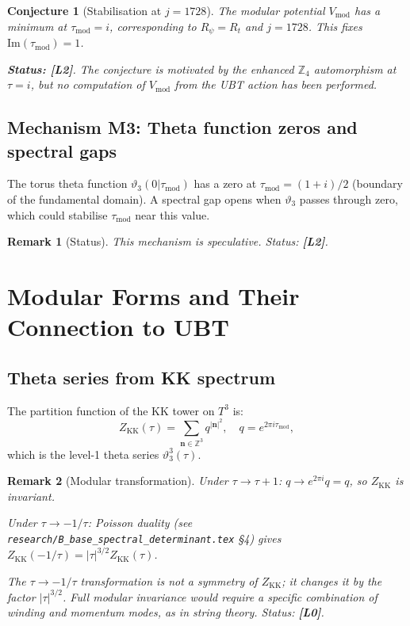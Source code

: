 \documentclass[11pt,a4paper]{article}
\newtheorem{remark}{Remark}
\newtheorem{conjecture}{Conjecture}
\begin{document}
\begin{conjecture}[Stabilisation at $j = 1728$]\label{conj:j1728}
  The modular potential $V_{\mathrm{mod}}$ has a minimum at $\tau_{\mathrm{mod}} = i$,
  corresponding to $R_\psi = R_t$ and $j = 1728$.  This fixes
  $\mathrm{Im}(\tau_{\mathrm{mod}}) = 1$.

  \textbf{Status: [L2]}.  The conjecture is motivated by the enhanced
  $\mathbb{Z}_4$ automorphism at $\tau = i$, but no computation of
  $V_{\mathrm{mod}}$ from the UBT action has been performed.
\end{conjecture}

\subsection{Mechanism M3: Theta function zeros and spectral gaps}

The torus theta function $\vartheta_3(0|\tau_{\mathrm{mod}})$ has a zero
at $\tau_{\mathrm{mod}} = (1 + i)/2$ (boundary of the fundamental domain).
A spectral gap opens when $\vartheta_3$ passes through zero, which could
stabilise $\tau_{\mathrm{mod}}$ near this value.

\begin{remark}[Status]
  This mechanism is speculative.  Status: \textbf{[L2]}.
\end{remark}

\section{Modular Forms and Their Connection to UBT}
\label{sec:mf}

\subsection{Theta series from KK spectrum}

The partition function of the KK tower on $T^3$ is:
\begin{equation}
\label{eq:kk_partition}
  Z_{\mathrm{KK}}(\tau)
  = \sum_{\mathbf{n}\in\mathbb{Z}^3}
    q^{|\mathbf{n}|^2},
  \quad q = e^{2\pi i\tau_{\mathrm{mod}}},
\end{equation}
which is the level-1 theta series $\vartheta_3^3(\tau)$.

\begin{remark}[Modular transformation]
  Under $\tau \to \tau + 1$: $q \to e^{2\pi i}q = q$, so
  $Z_{\mathrm{KK}}$ is invariant.
  
  Under $\tau \to -1/\tau$: Poisson duality (see
  \texttt{research/B\_base\_spectral\_determinant.tex} §4) gives
  $Z_{\mathrm{KK}}(-1/\tau) = |\tau|^{3/2} Z_{\mathrm{KK}}(\tau)$.

  The $\tau \to -1/\tau$ transformation is \emph{not} a symmetry of
  $Z_{\mathrm{KK}}$; it changes it by the factor $|\tau|^{3/2}$.
  Full modular invariance would require a specific combination of
  winding and momentum modes, as in string theory.
  Status: \textbf{[L0]}.
\end{remark}
\end{document}
